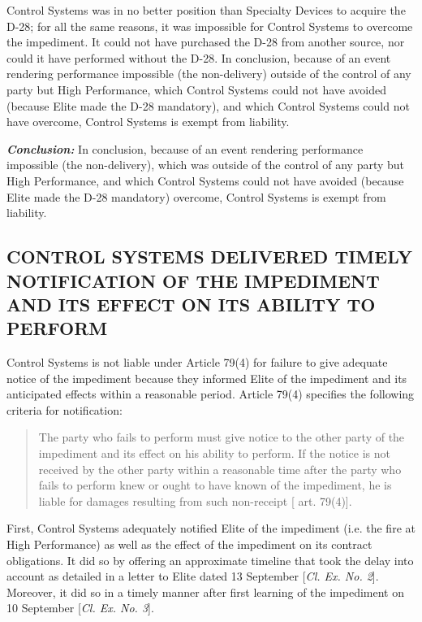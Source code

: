 Control Systems was in no better position than Specialty Devices to acquire the D-28; for all the same reasons, it was impossible for Control Systems to overcome the impediment. It could not have purchased the D-28 from another source, nor could it have performed without the D-28. In conclusion, because of an event rendering performance impossible (the non-delivery) outside of the control of any party but High Performance, which Control Systems could not have avoided (because Elite made the D-28 mandatory), and which Control Systems could not have overcome, Control Systems is exempt from liability. 

\textit{\textbf{Conclusion:}} In conclusion, because of an event rendering performance impossible (the non-delivery), which was outside of the control of any party but High Performance, and which Control Systems could not have avoided (because Elite made the D-28 mandatory) overcome, Control Systems is exempt from liability. 

\subsection{CONTROL SYSTEMS DELIVERED TIMELY NOTIFICATION OF THE IMPEDIMENT AND ITS EFFECT ON ITS ABILITY TO PERFORM}
 
Control Systems is not liable under Article 79(4) for failure to give adequate notice of the impediment because they informed Elite of the impediment and its anticipated effects within a reasonable period. Article 79(4) specifies the following criteria for notification: 

\begingroup
\begin{quote}
The party who fails to perform must give notice to the other party of the impediment and its effect on his ability to perform. If the notice is not received by the other party within a reasonable time after the party who fails to perform knew or ought to have known of the impediment, he is liable for damages resulting from such non-receipt [\cite{CISG} art. 79(4)]. 
\end{quote}
\endgroup
First, Control Systems adequately notified Elite of the impediment (i.e. the fire at High Performance) as well as the effect of the impediment on its contract obligations. It did so by offering an approximate timeline that took the delay into account as detailed in a letter to Elite dated 13 September [\textit{Cl. Ex. No. 2}]. Moreover, it did so in a timely manner after first learning of the impediment on 10 September [\textit{Cl. Ex. No. 3}].

